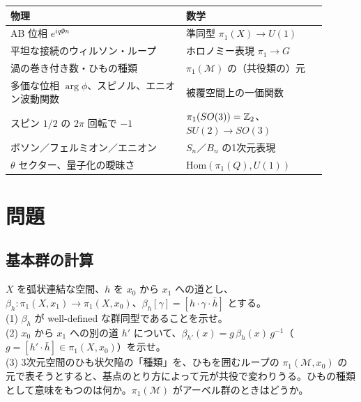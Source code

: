 \begin{physbox}[：本章の辞書]
\begin{center}
\small
\begin{tabular}{p{0.5\linewidth}p{0.4\linewidth}}
物理 & 数学\\ \hline
AB 位相 $e^{iq\Phi n}$ & 準同型 $\pi_1(X)\to U(1)$\\
平坦な接続のウィルソン・ループ & ホロノミー表現 $\pi_1\to G$\\
渦の巻き付き数・ひもの種類 & $\pi_1(\mathcal M)$ の（共役類の）元\\
多価な位相 $\arg\phi$、スピノル、エニオン波動関数 & 被覆空間上の一価関数\\
スピン $1/2$ の $2\pi$ 回転で $-1$ & $\pi_1(SO(3))=\mathbb{Z}_2$、$SU(2)\to SO(3)$\\
ボソン／フェルミオン／エニオン & $S_n$／$B_n$ の1次元表現\\
$\theta$ セクター、量子化の曖昧さ & $\mathrm{Hom}(\pi_1(Q),U(1))$
\end{tabular}
\end{center}
\end{physbox}

\section{問題}

\subsection{基本群の計算}

\begin{problem}[難易度 A]\label{ch02-prob-basept}
$X$ を弧状連結な空間、$h$ を $x_0$ から $x_1$ への道とし、$\beta_h\colon\pi_1(X,x_1)\to\pi_1(X,x_0)$、$\beta_h[\gamma]=[h\cdot\gamma\cdot\bar h]$ とする。\\
(1) $\beta_h$ が well-defined な群同型であることを示せ。\\
(2) $x_0$ から $x_1$ への別の道 $h'$ について、$\beta_{h'}(x)=g\,\beta_h(x)\,g^{-1}$（$g=[h'\cdot\bar h]\in\pi_1(X,x_0)$）を示せ。\\
(3) 3次元空間のひも状欠陥の「種類」を、ひもを囲むループの $\pi_1(\mathcal M,x_0)$ の元で表そうとすると、基点のとり方によって元が共役で変わりうる。ひもの種類として意味をもつのは何か。$\pi_1(\mathcal M)$ がアーベル群のときはどうか。
\end{problem}

